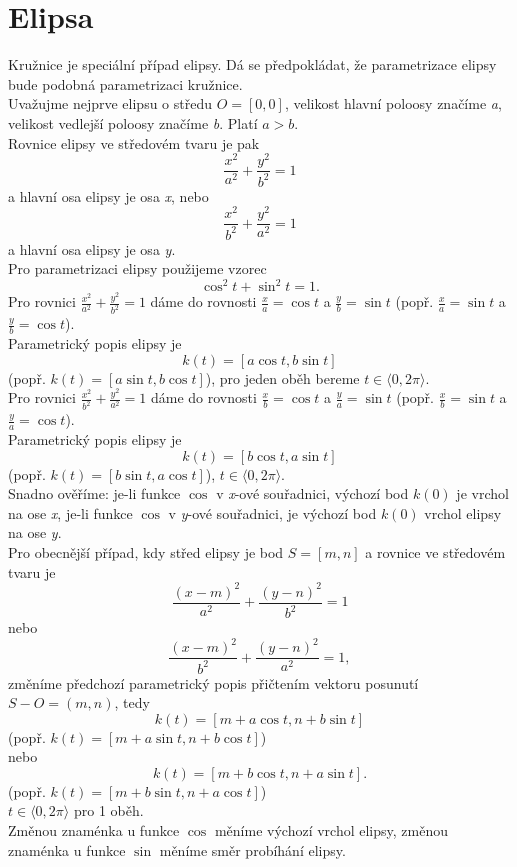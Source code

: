 		\section{Elipsa}
		Kružnice je speciální případ elipsy. Dá se předpokládat, že parametrizace elipsy bude podobná parametrizaci kružnice. \\
		Uvažujme nejprve elipsu o středu $O=[0,0]$, velikost hlavní poloosy značíme \textit{a}, velikost vedlejší poloosy
		značíme \textit{b}. Platí $a > b$. \\
		Rovnice elipsy ve středovém tvaru je pak
		$$\frac{x^2}{a^2}+\frac{y^2}{b^2}=1$$
		a hlavní osa elipsy je osa \textit{x}, nebo
		$$\frac{x^2}{b^2}+\frac{y^2}{a^2}=1$$
		a hlavní osa elipsy je osa \textit{y}. \\
		Pro parametrizaci elipsy použijeme vzorec
		$$\cos^2{t}+\sin^2{t}=1.$$
		Pro rovnici $\frac{x^2}{a^2}+\frac{y^2}{b^2}=1$ dáme do rovnosti $\frac{x}{a}=\cos{t}$ a $\frac{y}{b}=\sin{t}$
		(popř. $\frac{x}{a}=\sin{t}$ a $\frac{y}{b}=\cos{t}$). \\
		Parametrický popis elipsy je
		$$k(t)=[a\cos{t}, b\sin{t}]$$
		(popř. $k(t)=[a\sin{t}, b\cos{t}]$), pro jeden oběh bereme $t \in \langle0, 2\pi\rangle$. \\
		Pro rovnici $\frac{x^2}{b^2}+\frac{y^2}{a^2}=1$ dáme do rovnosti $\frac{x}{b}=\cos{t}$ a $\frac{y}{a}=\sin{t}$
		(popř. $\frac{x}{b}=\sin{t}$ a $\frac{y}{a}=\cos{t}$). \\
		Parametrický popis elipsy je
		$$k(t)=[b\cos{t}, a\sin{t}]$$
		(popř. $k(t)=[b\sin{t}, a\cos{t}]$), $t \in \langle0, 2\pi\rangle$. \\
		Snadno ověříme: je-li funkce $\cos$ v \textit{x}-ové souřadnici, výchozí bod $k(0)$ je vrchol na ose \textit{x}, je-li
		funkce $\cos$ v \textit{y}-ové souřadnici, je výchozí bod $k(0)$ vrchol elipsy na ose \textit{y}. \\
		Pro obecnější případ, kdy střed elipsy je bod $S=[m, n]$ a rovnice ve středovém tvaru je
		$$\frac{(x-m)^2}{a^2}+\frac{(y-n)^2}{b^2}=1$$
		nebo
		$$\frac{(x-m)^2}{b^2}+\frac{(y-n)^2}{a^2}=1,$$
		změníme předchozí parametrický popis přičtením vektoru posunutí $S-O=(m,n)$, tedy
		$$k(t)=[m+a\cos{t}, n+b\sin{t}]$$
		(popř. $k(t)=[m+a\sin{t}, n+b\cos{t}]$) \\
		nebo
		$$k(t)=[m+b\cos{t}, n+a\sin{t}].$$
		(popř. $k(t)=[m+b\sin{t}, n+a\cos{t}]$) \\			
		$t \in \langle0, 2\pi\rangle$ pro 1 oběh. \\[10pt]
		Změnou znaménka u funkce $\cos$ měníme výchozí vrchol elipsy, změnou znaménka u funkce $\sin$ měníme směr probíhání elipsy. \\
